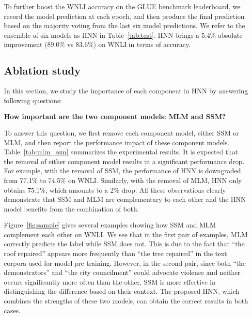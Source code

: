 \documentclass[11pt,a4paper]{article}
\newcommand{\nmodel}{HNN}
\begin{document}
To further boost the WNLI accuracy on the GLUE benchmark leaderboard, we record the model prediction at each epoch, and then produce the final prediction based on the majority voting from the last six model predictions. 
We refer to the ensemble of six models as {\nmodel} in Table~\ref{tab:test}. {\nmodel} brings a 5.4\% absolute improvement (89.0\% vs 83.6\%) on WNLI in terms of accuracy. 







\subsection{Ablation study}

In this section, we study the importance of each component in {\nmodel} by answering following questions: 

\noindent \textbf{How important are the two component models: MLM and SSM?}

To answer this question, we first remove each component model, either SSM or MLM, and then report the performance impact of these component models. 
Table~\ref{tab:mlm_ssm} summarizes the experimental results. It is expected that the removal of either component model results in a significant performance drop. 
For example, with the removal of SSM, the performance of {\nmodel} is downgraded from 77.1\% to 74.5\% on WNLI. Similarly, with the removal of MLM, {\nmodel} only obtains 75.1\%, which amounts to a 2\% drop. All these observations clearly demonstrate that SSM and MLM are complementary to each other and the {\nmodel} model benefits from the combination of both. 

Figure~\ref{fig:sample} gives several examples showing how SSM and MLM complement each other on WNLI. We see that in the first pair of examples, MLM correctly predicts the label while SSM does not. This is due to the fact that ``the roof repaired'' appears more frequently  than ``the tree repaired'' in the text corpora used for model pre-training. 
However, in the second pair, since both ``the demonstrators'' and ``the city councilment'' could advocate violence and neither occurs significantly more often than the other,  SSM is more effective in distinguishing the difference based on their context. 
The proposed HNN, which combines the strengths of these two models, can obtain the correct results in both cases.
\end{document}

